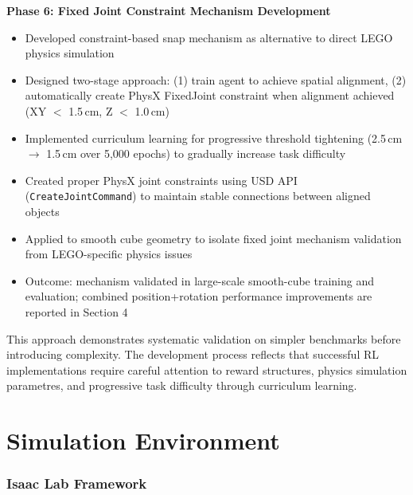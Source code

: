 \documentclass[12pt,a4paper,oneside]{report}
\begin{document}
\textbf{Phase 6: Fixed Joint Constraint Mechanism Development}
\begin{itemize}
    \item Developed constraint-based snap mechanism as alternative to direct LEGO physics simulation
    \item Designed two-stage approach: (1) train agent to achieve spatial alignment, (2) automatically create PhysX FixedJoint constraint when alignment achieved (XY $<$ 1.5\,cm, Z $<$ 1.0\,cm)
    \item Implemented curriculum learning for progressive threshold tightening (2.5\,cm $\rightarrow$ 1.5\,cm over 5{,}000 epochs) to gradually increase task difficulty
    \item Created proper PhysX joint constraints using USD API (\texttt{CreateJointCommand}) to maintain stable connections between aligned objects
    \item Applied to smooth cube geometry to isolate fixed joint mechanism validation from LEGO-specific physics issues
    \item Outcome: mechanism validated in large-scale smooth-cube training and evaluation; combined position+rotation performance improvements are reported in Section 4
\end{itemize}

This approach demonstrates systematic validation on simpler benchmarks before introducing complexity. The development process reflects that successful RL implementations require careful attention to reward structures, physics simulation parametres, and progressive task difficulty through curriculum learning.

\section{Simulation Environment}

\subsubsection{Isaac Lab Framework}
\end{document}
